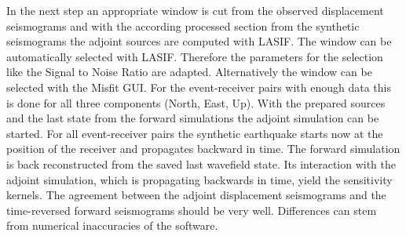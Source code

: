 In the next step an appropriate window %
is cut from the observed displacement seismograms and with the according processed section from the synthetic seismograms 
the adjoint sources are computed with LASIF.
The window can be automatically selected with LASIF. 
Therefore the parameters for the selection like the Signal to Noise Ratio are adapted.
Alternatively the window can be selected with the Misfit GUI.
For the event-receiver pairs with enough data this is done for all three components (North, East, Up).
With the prepared sources and the last state from the forward simulations the adjoint simulation can be started.
For all event-receiver pairs the synthetic earthquake starts now at the position of the receiver and propagates
backward in time.  
The forward simulation is back reconstructed from the saved last wavefield state. 
Its interaction with the adjoint simulation, which is propagating backwards in time,
yield the sensitivity kernels. %
The agreement between the adjoint displacement seismograms and the time-reversed forward seismograms should be very well.
Differences can stem from numerical inaccuracies of the software. %











